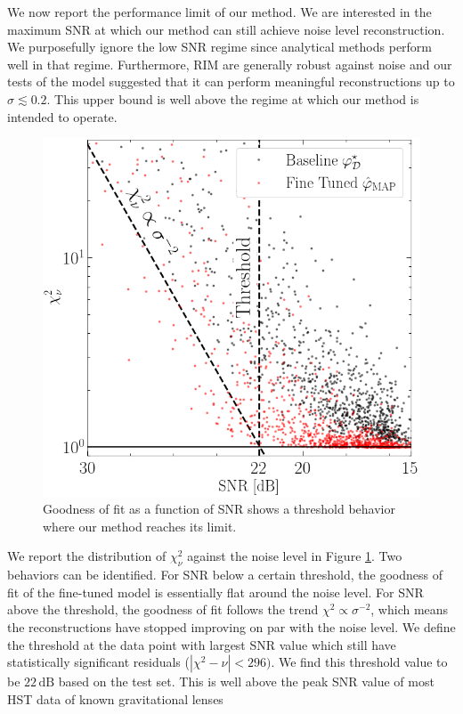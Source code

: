 \documentclass[twocolumn]{aastex631}
\begin{document}
We now report the performance limit of our method. We are interested in the maximum SNR 
at which our method can still achieve noise level reconstruction. 
We purposefully ignore the 
low SNR regime since analytical methods perform well in that regime. Furthermore, 
RIM are generally robust against noise and our tests of the model
suggested that it can perform meaningful reconstructions up to $\sigma \lesssim 0.2$. 
This upper bound is well above the regime at which our method is intended to operate. 

\begin{figure}[ht!]
        \centering
        \includegraphics[width=0.8\columnwidth]{figures/chisq_vs_noise_ewc}
        \caption{Goodness of fit as a function of SNR shows a threshold 
        behavior where our method reaches its limit.}
        \label{fig:chi squared vs noise}
\end{figure}

We report the distribution 
of $\chi^2_\nu$ against the noise level in Figure \ref{fig:chi squared vs noise}.
Two behaviors can be identified. For SNR below a certain threshold, the goodness of fit 
of the fine-tuned model is essentially flat around the noise level. 
For SNR above the threshold, 
the goodness of fit follows the trend $\chi^2 \propto \sigma^{-2}$, which 
means the reconstructions have stopped improving on par with the noise level.
We define the threshold at the data point with largest 
SNR value which still 
have statistically significant residuals ($|\chi^2 - \nu| < 296)$. We 
find this threshold value to be $22\, \mathrm{dB}$ based on the test set. 
This is well above the peak SNR value of most HST data 
of known gravitational lenses
\end{document}
